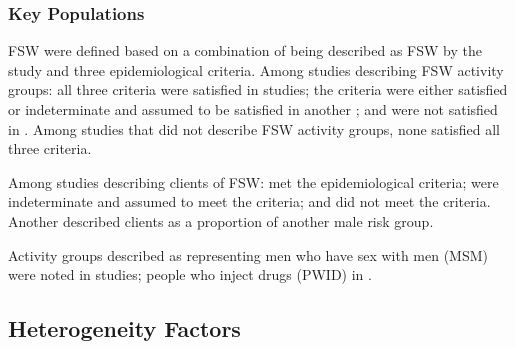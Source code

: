 \subsubsection{Key Populations}
\label{sss:res:kp}
FSW were defined based on a combination of  %
being described as FSW by the study and three epidemiological criteria.
Among  studies describing FSW activity groups:
all three criteria were satisfied in  studies;  %
the criteria were either satisfied or indeterminate and assumed to be satisfied
in another ;
and were not satisfied in .
Among studies that did not describe FSW activity groups,
none satisfied all three criteria.  %
\par
Among  studies describing clients of FSW:
 met the epidemiological criteria;
 were indeterminate and assumed to meet the criteria; and
 did not meet the criteria.
Another  described clients as a proportion of another male risk group.
\par
Activity groups described as representing
men who have sex with men (MSM) were noted in  studies;
people who inject drugs (PWID) in .
\subsection{Heterogeneity Factors}
\label{ss:res:factors}

